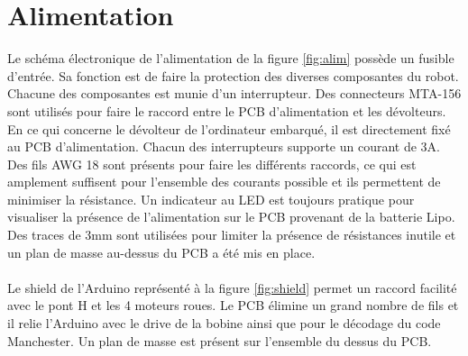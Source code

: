 \section{Alimentation}

Le schéma électronique de l'alimentation de la figure \ref{fig:alim} possède un fusible d'entrée. Sa fonction est de faire la protection des diverses composantes du robot. Chacune des composantes est munie d'un interrupteur. Des connecteurs MTA-156 sont utilisés pour faire le raccord entre le PCB d'alimentation et les dévolteurs. En ce qui concerne le dévolteur de l'ordinateur embarqué, il est directement fixé au PCB d'alimentation. Chacun des interrupteurs supporte un courant de 3A. Des fils AWG 18 sont présents pour faire les différents raccords, ce qui est amplement suffisent pour l'ensemble des courants possible et ils permettent de minimiser la résistance. Un indicateur au LED est toujours pratique pour visualiser la présence de l'alimentation sur le PCB provenant de la batterie Lipo. Des traces de 3mm sont utilisées pour limiter la présence de résistances inutile et un plan de masse au-dessus du PCB a été mis en place. 

\paragraph{}
Le shield de l'Arduino représenté à la figure \ref{fig:shield} permet un raccord facilité avec le pont H et les 4 moteurs roues. Le PCB élimine un grand nombre de fils et il relie l'Arduino avec le drive de la bobine ainsi que pour le décodage du code Manchester. Un plan de masse est présent sur l'ensemble du dessus du PCB. 


